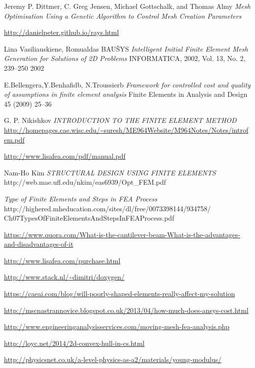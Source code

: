 \begin{changemargin}{\CMwidth}{\CMheight}
\begin{thebibliography}{9}
 Jeremy P. Dittmer, C. Greg Jensen, Michael Gottschalk, and Thomas Almy \emph{Mesh Optimisation Using a Genetic Algorithm to Control Mesh Creation Parameters}

 \url{http://danielpeter.github.io/rays.html}

 Lina Vasiliauskiene, Romualdas BAUŠYS \emph{Intelligent Initial Finite Element Mesh Generation for Solutions of 2D Problems} INFORMATICA, 2002, Vol. 13, No. 2, 239–250 2002

 E.Bellengera,Y.Benhafidb, N.Troussierb \emph{Framework for controlled cost and quality of assumptions in finite element analysis} Finite Elements in Analysis and Design 45 (2009) 25--36

 G. P. Nikishkov \emph{INTRODUCTION TO THE FINITE ELEMENT METHOD} \url{http://homepages.cae.wisc.edu/~suresh/ME964Website/M964Notes/Notes/introfem.pdf}

 \url{http://www.lisafea.com/pdf/manual.pdf}

Nam-Ho Kim \emph{STRUCTURAL DESIGN USING FINITE ELEMENTS} http://web.mae.ufl.edu/nkim/eas6939/Opt\_FEM.pdf

\emph{Type of Finite Elements and Steps in FEA Process}\\
http://highered.mheducation.com/sites/dl/free/0073398144/934758/\\Ch07TypesOfFiniteElementsAndStepsInFEAProcess.pdf 

 \url{https://www.quora.com/What-is-the-cantilever-beam-What-is-the-advantages-and-disadvantages-of-it}

 \url{http://www.lisafea.com/purchase.html}

 \url{http://www.stack.nl/~dimitri/doxygen/} 

 \url{https://caeai.com/blog/will-poorly-shaped-elements-really-affect-my-solution}

 \url{http://mscnastrannovice.blogspot.co.uk/2013/04/how-much-does-ansys-cost.html}

 \url{http://www.engineeringanalysisservices.com/moving-mesh-fea-analysis.php}

 \url{http://loyc.net/2014/2d-convex-hull-in-cs.html}

 \url{http://physicsnet.co.uk/a-level-physics-as-a2/materials/young-modulus/}


\end{thebibliography}
\end{changemargin}
